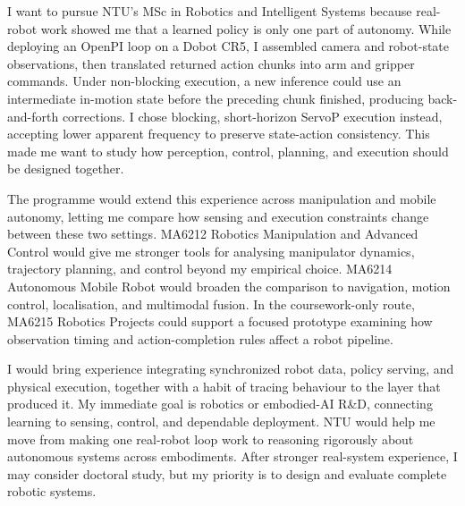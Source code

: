 I want to pursue NTU's MSc in Robotics and Intelligent Systems because real-robot work showed me that a learned policy is only one part of autonomy. While deploying an OpenPI loop on a Dobot CR5, I assembled camera and robot-state observations, then translated returned action chunks into arm and gripper commands. Under non-blocking execution, a new inference could use an intermediate in-motion state before the preceding chunk finished, producing back-and-forth corrections. I chose blocking, short-horizon ServoP execution instead, accepting lower apparent frequency to preserve state-action consistency. This made me want to study how perception, control, planning, and execution should be designed together.

The programme would extend this experience across manipulation and mobile autonomy, letting me compare how sensing and execution constraints change between these two settings. MA6212 Robotics Manipulation and Advanced Control would give me stronger tools for analysing manipulator dynamics, trajectory planning, and control beyond my empirical choice. MA6214 Autonomous Mobile Robot would broaden the comparison to navigation, motion control, localisation, and multimodal fusion. In the coursework-only route, MA6215 Robotics Projects could support a focused prototype examining how observation timing and action-completion rules affect a robot pipeline.

I would bring experience integrating synchronized robot data, policy serving, and physical execution, together with a habit of tracing behaviour to the layer that produced it. My immediate goal is robotics or embodied-AI R\&D, connecting learning to sensing, control, and dependable deployment. NTU would help me move from making one real-robot loop work to reasoning rigorously about autonomous systems across embodiments. After stronger real-system experience, I may consider doctoral study, but my priority is to design and evaluate complete robotic systems.
